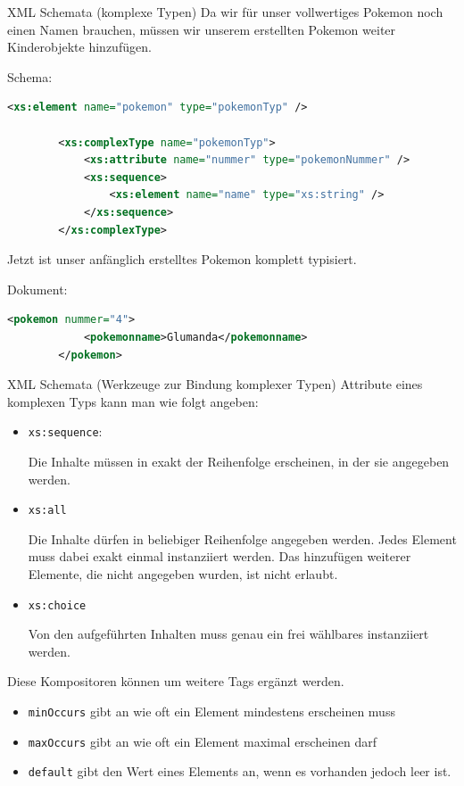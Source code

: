 \begin{example}{XML Schemata (komplexe Typen)}
    Da wir für unser vollwertiges Pokemon noch einen Namen brauchen, müssen wir unserem erstellten Pokemon weiter Kinderobjekte hinzufügen.
    
    Schema:
    \begin{lstlisting}[language=XML]
        <xs:element name="pokemon" type="pokemonTyp" />

        <xs:complexType name="pokemonTyp">
            <xs:attribute name="nummer" type="pokemonNummer" />
            <xs:sequence>
                <xs:element name="name" type="xs:string" />
            </xs:sequence>
        </xs:complexType>
    \end{lstlisting}
    
    Jetzt ist unser anfänglich erstelltes Pokemon komplett typisiert.
    
    Dokument:
    \begin{lstlisting}[language=XML]
        <pokemon nummer="4">
            <pokemonname>Glumanda</pokemonname>
        </pokemon>
    \end{lstlisting}
\end{example}

\begin{bonus}{XML Schemata (Werkzeuge zur Bindung komplexer Typen)}
    Attribute eines komplexen Typs kann man wie folgt angeben:
    
    \begin{itemize}
        \item \texttt{xs:sequence}:
              
              Die Inhalte müssen in exakt der Reihenfolge erscheinen, in der sie angegeben werden.
        \item \texttt{xs:all}
              
              Die Inhalte dürfen in beliebiger Reihenfolge angegeben werden.
              Jedes Element muss dabei exakt einmal instanziiert werden.
              Das hinzufügen weiterer Elemente, die nicht angegeben wurden, ist nicht erlaubt.
        \item \texttt{xs:choice}
              
              Von den aufgeführten Inhalten muss genau ein frei wählbares instanziiert werden.
    \end{itemize}
    
    Diese Kompositoren können um weitere Tags ergänzt werden.
    
    \begin{itemize}
        \item \texttt{minOccurs} gibt an wie oft ein Element mindestens erscheinen muss
        \item \texttt{maxOccurs} gibt an wie oft ein Element maximal erscheinen darf
        \item \texttt{default} gibt den Wert eines Elements an, wenn es vorhanden jedoch leer ist.
    \end{itemize}
\end{bonus}

